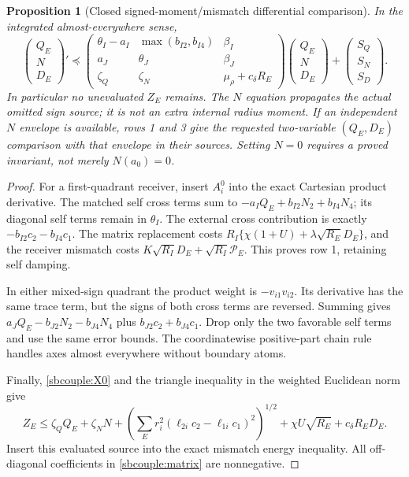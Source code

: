 \documentclass{article} %
\theoremstyle{plain}
\newtheorem{proposition}[theorem]{Proposition}
\theoremstyle{definition}
\theoremstyle{remark}
\begin{document}
\begin{proposition}[Closed signed-moment/mismatch differential comparison]
\label{sbcouple:comparison}
In the integrated almost-everywhere sense,
\begin{equation}\label{sbcouple:matrix}
 \begin{pmatrix}Q_E\\N\\D_E\end{pmatrix}'\preceq
 \begin{pmatrix}
 \theta_I-a_I&\max(b_{I2},b_{I4})&\beta_I\\
 a_J&\theta_J&\beta_J\\
 \zeta_Q&\zeta_N&\mu_\rho+c_\delta R_E
 \end{pmatrix}
 \begin{pmatrix}Q_E\\N\\D_E\end{pmatrix}
 +\begin{pmatrix}S_Q\\S_N\\S_D\end{pmatrix}.
\end{equation}
In particular no unevaluated $Z_E$ remains. The $N$ equation propagates
the actual omitted sign source; it is not an extra internal radius moment.
If an independent $N$ envelope is available, rows 1 and 3 give the requested
two-variable $(Q_E,D_E)$ comparison with that envelope in their sources.
Setting $N=0$ requires a proved invariant, not merely $N(a_0)=0$.
\end{proposition}
\begin{proof}
For a first-quadrant receiver, insert $A_i^0$ into the exact Cartesian
product derivative. The matched self cross terms sum to
$-a_IQ_E+b_{I2}N_2+b_{I4}N_4$; its diagonal self terms remain in
$\theta_I$. The external cross contribution is exactly
$-b_{I2}c_2-b_{I4}c_1$. The matrix replacement costs
$R_I\{\chi(1+U)+\lambda\sqrt{R_E}D_E\}$, and the receiver mismatch
costs $K\sqrt{R_I}D_E+\sqrt{R_I}\mathcal P_E$.
This proves row 1, retaining self damping.

In either mixed-sign quadrant the product weight is $-v_{i1}v_{i2}$.
Its derivative has the same trace term, but the signs of both cross
terms are reversed. Summing gives $a_JQ_E-b_{J2}N_2-b_{J4}N_4$ plus
$b_{J2}c_2+b_{J4}c_1$. Drop only the two favorable self terms and use
the same error bounds. The coordinatewise positive-part chain rule
handles axes almost everywhere without boundary atoms.

Finally, \eqref{sbcouple:X0} and the triangle inequality in the weighted
Euclidean norm give
\[
 Z_E\le\zeta_QQ_E+\zeta_NN+
 \left(\sum_Er_i^2(\ell_{2i}c_2-\ell_{1i}c_1)^2\right)^{1/2}
 +\chi U\sqrt{R_E}+c_\delta R_ED_E.
\]
Insert this evaluated source into the exact mismatch energy inequality.
All off-diagonal coefficients in \eqref{sbcouple:matrix} are nonnegative.
\end{proof}
\end{document}

